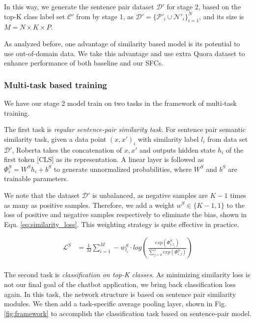 In this way, we generate the sentence pair dataset $\mathcal{D'}$ for stage 2, based on the top-K class label set $\mathcal{C'}$ from by stage 1, as $\mathcal{D'}=\{\mathcal{P'}_{i}\cup \mathcal{N'}_{i}\}_{i=1}^{N}$, and its size is $M=N\times K\times P$.

As analyzed before, one advantage of similarity based model is its potential to use out-of-domain data. We take this advantage and use extra Quora dataset \cite{iyer2017first} to enhance performance of both baseline and our SFCs.

\subsubsection*{Multi-task based training}
We have our stage 2 model train on two tasks in the framework of multi-task training. 

The first task is \emph{regular sentence-pair similarity task}.
For sentence pair semantic similarity task, given a data point $(x, x')_{i}$ with similarity label $l_{i}$ from data set $\mathcal{D'}$, Roberta takes the concatenation of $x, x'$ and outputs hidden state $h_{i}$ of the first token [CLS] as its representation.
A linear layer is followed as ${\Phi}^S_{i}=W^Sh_{i}+b^S$ to generate unnormalized probabilities, where $W^S$ and $b^S$ are trainable parameters. 

We note that the dataset $\mathcal{D'}$ is unbalanced, as negative samples are $K - 1$ times as many as positive samples.
Therefore, we add a weight $w^S \in \{K-1, 1\} $ to the loss of positive and negative samples respectively to eliminate the bias, shown in Equ. \ref{eq:similarity_loss}.
This weighting strategy is quite effective in practice. 

\vspace{-1.5em}
\begin{equation}
  \begin{aligned}
    \mathcal{L}^{S}&=\frac{1}{M}\sum_{i=1}^{M}-w^S_{l_i}\cdot log(\frac{exp(\varPhi_{i,l_{i}}^S)}{\sum_{j=0}^{1}exp(\varPhi_{i,j}^S)}) \\
    \label{eq:similarity_loss}
  \end{aligned}
\end{equation}
\vspace{-2em}

The second task is \emph{classification on top-K classes}. 
As minimizing similarity loss is not our final goal of the chatbot application, we bring back classification loss again. 
In this task, the network structure is based on sentence pair similarity modules. 
We then add a task-specific average pooling layer, shown in Fig. \ref{fig:framework} to accomplish the classification task based on sentence-pair model.

